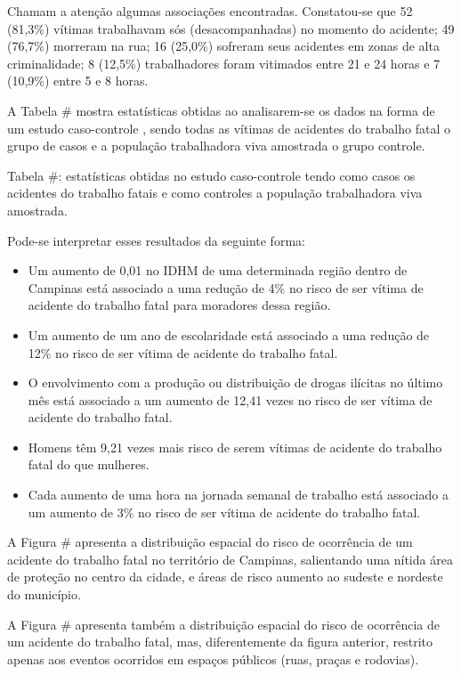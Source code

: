Chamam a atenção algumas associações encontradas. Constatou-se que 52 (81,3\%) vítimas trabalhavam sós (desacompanhadas) no momento do acidente; 49 (76,7\%) morreram na rua; 16 (25,0\%) sofreram seus acidentes em zonas de alta criminalidade; 8 (12,5\%) trabalhadores foram vitimados entre 21 e 24 horas
e 7 (10,9\%) entre 5 e 8 horas.

A Tabela \# mostra estatísticas obtidas ao analisarem-se os dados na forma de um estudo caso-controle \citep{rothman2008modern}, sendo todas as vítimas de acidentes do trabalho fatal o grupo de casos e a população trabalhadora viva amostrada o grupo controle.

Tabela \#: estatísticas obtidas no estudo caso-controle tendo como casos os acidentes do trabalho fatais e como controles a população trabalhadora viva amostrada.


Pode-se interpretar esses resultados da seguinte forma:
\begin{itemize}
    \item Um aumento de 0,01 no IDHM de uma determinada região dentro de Campinas está associado a uma redução de 4\% no risco de ser vítima de acidente do trabalho fatal para moradores dessa região.
    \item Um aumento de um ano de escolaridade está associado a uma redução de 12\% no risco de ser vítima de acidente do trabalho fatal.
    \item O envolvimento com a produção ou distribuição de drogas ilícitas no último mês está associado a um aumento de 12,41 vezes no risco de ser vítima de acidente do trabalho fatal.
    \item Homens têm 9,21 vezes mais risco de serem vítimas de acidente do trabalho fatal do que mulheres.
    \item Cada aumento de uma hora na jornada semanal de trabalho está associado a um aumento de 3\% no risco de ser vítima de acidente do trabalho fatal.
\end{itemize}



A Figura \# apresenta a distribuição espacial do risco de ocorrência de um acidente do trabalho fatal no território de Campinas, salientando uma nítida área de proteção no centro da cidade, e áreas de risco aumento ao sudeste e nordeste do município.

A Figura \# apresenta também a distribuição espacial do risco de ocorrência de um acidente do trabalho fatal, mas, diferentemente da figura anterior, restrito apenas aos eventos ocorridos em espaços públicos (ruas, praças e rodovias).

